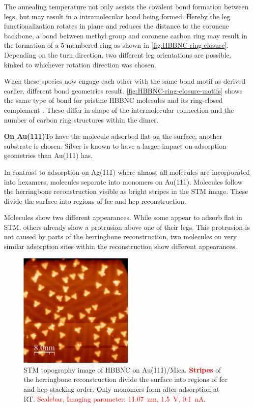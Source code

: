 The annealing temperature not only assists the covalent bond formation between legs, but may result in a intramolecular bond being formed. Hereby the leg functionalization rotates in plane and reduces the distance to the coronene backbone, a bond between methyl group and coronene carbon ring may result in the formation of a 5-membered ring as shown in \autoref{fig:HBBNC-ring-closure}. Depending on the turn direction, two different leg orientations are possible, kinked to whichever rotation direction was chosen.

When these species now engage each other with the same bond motif as derived earlier, different bond geometries result. \autoref{fig:HBBNC-ring-closure-motifs} shows the same type of bond for pristine HBBNC molecules   and its ring-closed complement . These differ in shape of the intermolecular connection and the number of carbon ring structures within the dimer. 

\textbf{On Au(111)}To have the molecule adsorbed flat on the surface, another substrate is chosen. Silver is known to have a larger impact on adsorption geometries than Au(111) has.

In contrast to adsorption on Ag(111) where almost all molecules are incorporated into hexamers, molecules separate into monomers on Au(111). Molecules follow the herringbone reconstruction visible as bright stripes in the STM image. These divide the surface into regions of fcc and hcp reconstruction.

Molecules show two different appearances. While some appear to adsorb flat in STM, others already show a protrusion above one of their legs. This protrusion is not caused by parts of the herringbone reconstruction, two molecules on very similar adsorption sites within the reconstruction show different appearances.

\begin{figure}[] \centering
	\includegraphics[width=0.5\textwidth]{./images/hbbnc-au-111-rt}
	\caption{STM topography image of HBBNC on Au(111)/Mica. \textcolor{red}{\textbf{Stripes}} of the herringbone reconstruction divide the surface into regions of fcc and hcp stacking order. Only monomers form after adsorption at RT. \textcolor{red}{Scalebar, Imaging parameter: \SI{11.07}{\nano \meter}, \SI{1.5}{\volt}, \SI{0.1}{\nano \ampere}}.}
	\label{}
\end{figure}

